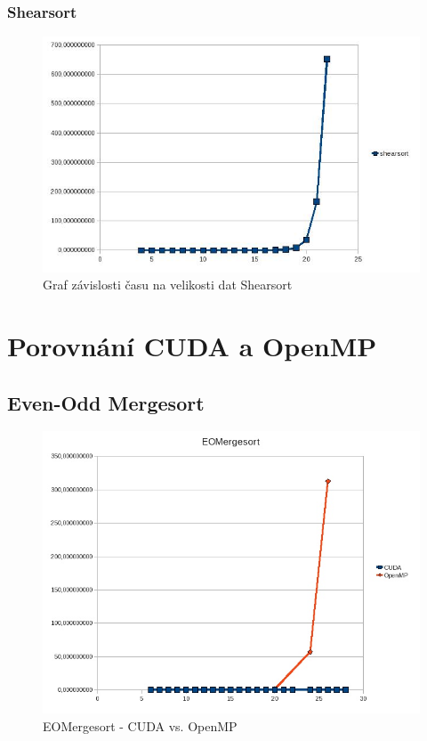 \documentclass[12pt]{article}
\begin{document}
\subsubsection{Shearsort}
\begin{figure}[H]
\begin{center}
\includegraphics[width=14cm]{cuda-shearsort.jpg}
\caption{Graf závislosti času na velikosti dat Shearsort}
\label{fig:cuda-shearsort}
\end{center}
\end{figure}

\section{Porovnání CUDA a OpenMP}
\subsection{Even-Odd Mergesort}
\begin{figure}[H]
\begin{center}
\includegraphics[width=14cm]{eom-cudavsomp.jpg}
\caption{EOMergesort - CUDA vs. OpenMP}
\label{fig:eom-cuda-vs-omp}
\end{center}
\end{figure}
\end{document}
